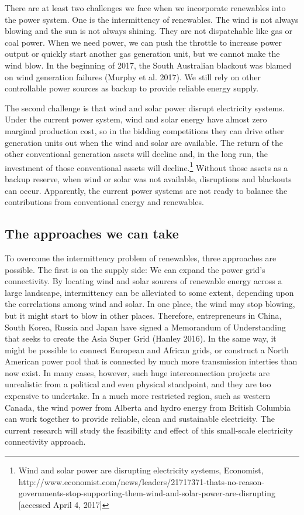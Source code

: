\documentclass[10pt,letter]{article}
\begin{document}
There are at least two challenges we face when we incorporate renewables
into the power system. One is the intermittency of renewables. The wind
is not always blowing and the sun is not always shining. They are not
dispatchable like gas or coal power. When we need power, we can push the
throttle to increase power output or quickly start another gas
generation unit, but we cannot make the wind blow. In the beginning of
2017, the South Australian blackout was blamed on wind generation
failures (Murphy et al. 2017). We still rely on other controllable power
sources as backup to provide reliable energy supply.

The second challenge is that wind and solar power disrupt electricity
systems. Under the current power system, wind and solar energy have
almost zero marginal production cost, so in the bidding competitions
they can drive other generation units out when the wind and solar are
available. The return of the other conventional generation assets will
decline and, in the long run, the investment of those conventional
assets will decline.\footnote{Wind and solar power are disrupting
  electricity systems, Economist,
  http://www.economist.com/news/leaders/21717371-thats-no-reason-governments-stop-supporting-them-wind-and-solar-power-are-disrupting
  {[}accessed April 4, 2017{]}} Without those assets as a backup
reserve, when wind or solar was not available, disruptions and blackouts
can occur. Apparently, the current power systems are not ready to
balance the contributions from conventional energy and renewables.

\subsection{The approaches we can
take}\label{the-approaches-we-can-take}

To overcome the intermittency problem of renewables, three approaches
are possible. The first is on the supply side: We can expand the power
grid's connectivity. By locating wind and solar sources of renewable
energy across a large landscape, intermittency can be alleviated to some
extent, depending upon the correlations among wind and solar. In one
place, the wind may stop blowing, but it might start to blow in other
places. Therefore, entrepreneurs in China, South Korea, Russia and Japan
have signed a Memorandum of Understanding that seeks to create the Asia
Super Grid (Hanley 2016). In the same way, it might be possible to
connect European and African grids, or construct a North American power
pool that is connected by much more transmission interties than now
exist. In many cases, however, such huge interconnection projects are
unrealistic from a political and even physical standpoint, and they are
too expensive to undertake. In a much more restricted region, such as
western Canada, the wind power from Alberta and hydro energy from
British Columbia can work together to provide reliable, clean and
sustainable electricity. The current research will study the feasibility
and effect of this small-scale electricity connectivity approach.
\end{document}
